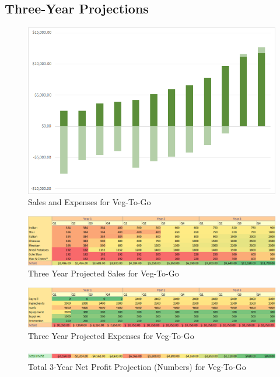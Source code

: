 \documentclass[12pt, letterpaper]{article}
\newcommand{\companyname}{Veg-To-Go}
\begin{document}
\subsection{Three-Year Projections}

\begin{figure}[H]
	\caption{Sales and Expenses for \companyname{}}
	\includegraphics[width=\textwidth]{SalesAndExpenses}
\end{figure}

\begin{figure}[H]
	\label{products}
	\caption{Three Year Projected Sales for \companyname{}}
	\includegraphics[width=\textwidth]{SalesNumbers}
\end{figure}

\begin{figure}[H]
	\caption{Three Year Projected Expenses for \companyname{}}
	\includegraphics[width=\textwidth]{ExpensesNumbers}
\end{figure}

\begin{figure}[H]
	\caption{Total 3-Year Net Profit Projection (Numbers) for \companyname{}}
	\includegraphics[width=\textwidth]{TotalProfitNumbers}
\end{figure}
\end{document}

